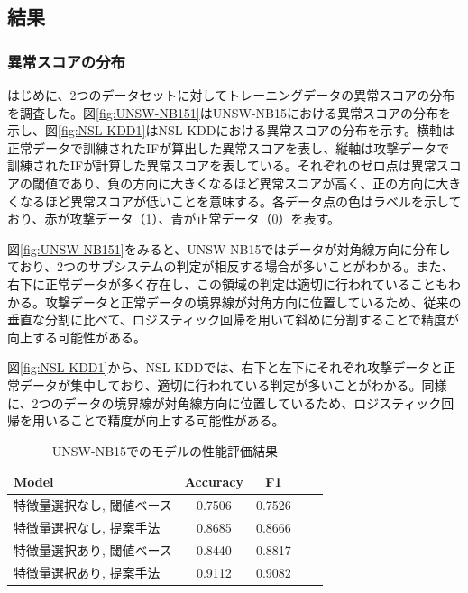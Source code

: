 \documentclass{css}
\begin{document}
\subsection{結果}

\subsubsection{異常スコアの分布}
はじめに、2つのデータセットに対してトレーニングデータの異常スコアの分布を調査した。図\ref{fig:UNSW-NB151}はUNSW-NB15における異常スコアの分布を示し、図\ref{fig:NSL-KDD1}はNSL-KDDにおける異常スコアの分布を示す。横軸は正常データで訓練されたIFが算出した異常スコアを表し、縦軸は攻撃データで訓練されたIFが計算した異常スコアを表している。それぞれのゼロ点は異常スコアの閾値であり、負の方向に大きくなるほど異常スコアが高く、正の方向に大きくなるほど異常スコアが低いことを意味する。各データ点の色はラベルを示しており、赤が攻撃データ（1）、青が正常データ（0）を表す。

図\ref{fig:UNSW-NB151}をみると、UNSW-NB15ではデータが対角線方向に分布しており、2つのサブシステムの判定が相反する場合が多いことがわかる。また、右下に正常データが多く存在し、この領域の判定は適切に行われていることもわかる。攻撃データと正常データの境界線が対角方向に位置しているため、従来の垂直な分割に比べて、ロジスティック回帰を用いて斜めに分割することで精度が向上する可能性がある。

図\ref{fig:NSL-KDD1}から、NSL-KDDでは、右下と左下にそれぞれ攻撃データと正常データが集中しており、適切に行われている判定が多いことがわかる。同様に、2つのデータの境界線が対角線方向に位置しているため、ロジスティック回帰を用いることで精度が向上する可能性がある。

\begin{table}[ht]
    \caption{UNSW-NB15でのモデルの性能評価結果}
    \centering
    \footnotesize
    \begin{tabular}{lcccc}
        \hline\hline
        Model & Accuracy & F1 \\
        \hline
        特徴量選択なし, 閾値ベース & 0.7506 & 0.7526 \\
        特徴量選択なし, 提案手法 & 0.8685 & 0.8666 \\
        特徴量選択あり, 閾値ベース & 0.8440 & 0.8817 \\
        特徴量選択あり, 提案手法 & 0.9112 & 0.9082 \\
        \hline
    \end{tabular}
    \label{tab:model_performance_UNSW-NB15}
\end{table}
\end{document}
